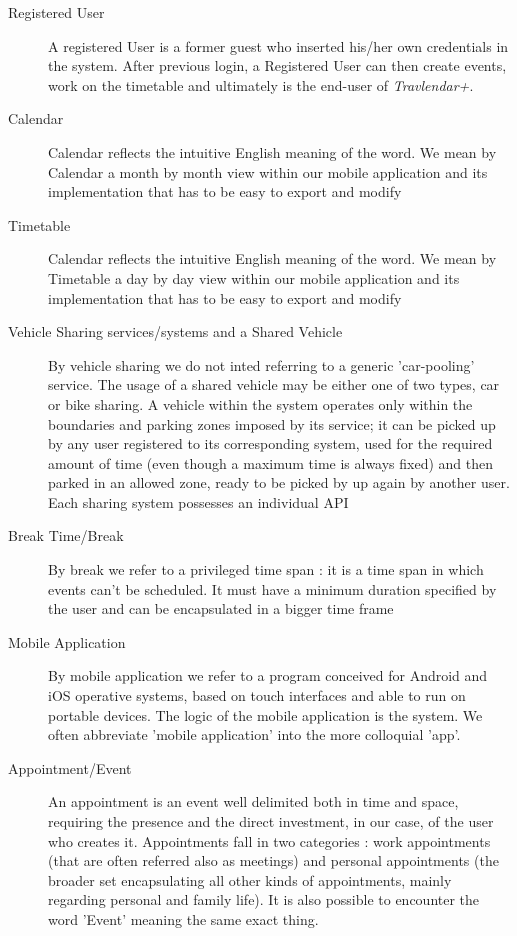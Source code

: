 \begin{description}
				\item[Registered User] A registered User is a former guest who inserted his/her own credentials in the system. After previous login, a Registered User can then create events, work on the timetable and ultimately is the end-user of \textit{Travlendar+}.
				\item[Calendar] Calendar reflects the intuitive English meaning of the word. We mean by Calendar a month by month view within our mobile application and its implementation that has to be easy to export and modify
			       	\item[Timetable] Calendar reflects the intuitive English meaning of the word. We mean by Timetable a day by day view within our mobile application and its implementation that has to be easy to export and modify
				\item[Vehicle Sharing services/systems and a Shared Vehicle] By vehicle sharing we do not inted referring to a generic 'car-pooling' service. The usage of a shared vehicle may be either one of two types, car or bike sharing. A vehicle within the system operates only within the boundaries and parking zones imposed by its service; it can be picked up by any user registered to its corresponding system, used for the required amount of time (even though a maximum time is always fixed) and then parked in an allowed zone, ready to be picked by up again by another user. Each sharing system possesses an individual API					\item[Break Time/Break] By break we refer to a privileged time span : it is a time span in which events can't be scheduled. It must have a minimum duration specified by the user and can be encapsulated in a bigger time frame
				\item[Mobile Application] By mobile application we refer to a program conceived for Android and iOS operative systems, based on touch interfaces and able to run on portable devices. The logic of the mobile application is the system. We often abbreviate 'mobile application' into the more colloquial 'app'.
				\item[Appointment/Event] An appointment is an event well delimited both in time and space, requiring the presence and the direct investment, in our case, of the user who creates it. Appointments fall in two categories : work appointments (that are often referred also as meetings) and personal appointments (the broader set encapsulating all other kinds of appointments, mainly regarding personal and family life). It is also possible to encounter the word 'Event' meaning the same exact thing.

\end{description}

